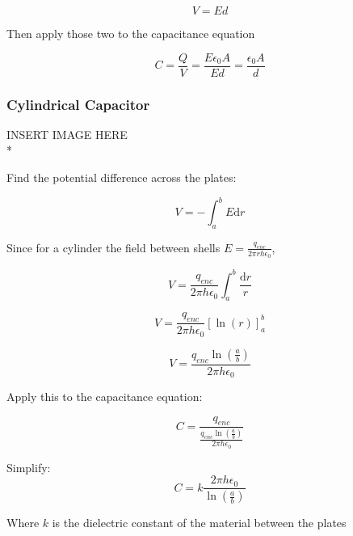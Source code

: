\documentclass[a4paper,12pt]{article}
\begin{document}
				\begin{equation*}
						V = Ed
				\end{equation*}

				Then apply those two to the capacitance equation

				\begin{equation*}
						C = \frac{Q}{V} = \frac{E\epsilon_{0}A}{Ed} = \frac{\epsilon_{0}A}{d}
				\end{equation*}
			\subsubsection{Cylindrical Capacitor}
				INSERT IMAGE HERE\\*

				Find the potential difference across the plates:

				\begin{equation*}
						V = - \int_{a}^{b} E\mathrm{d}r
				\end{equation*}

				Since for a cylinder the field between shells $E = \frac{q_{enc}}{2\pi rh \epsilon_{0}}$,

				\begin{equation*}
						V = \frac{q_{enc}}{2\pi h \epsilon_{0}}\int_{a}^{b} \frac{\mathrm{d}r}{r} 
				\end{equation*}


				\begin{equation*}
						V = \frac{q_{enc}}{2\pi h \epsilon_{0}}  \left[ \ln(r) \right]_{a}^{b}
				\end{equation*}

				\begin{equation*}
						V = \frac{q_{enc} \ln(\frac{a}{b})}{2\pi h\epsilon_{0}}
				\end{equation*}

				Apply this to the capacitance equation:

				\begin{equation*}
						C = \frac{q_{enc}}{\frac{q_{enc} \ln(\frac{a}{b})}{2\pi h\epsilon_{0}} }
				\end{equation*}

				Simplify:
				\begin{equation*}
						C = k \frac{2\pi h \epsilon_{0}}{\ln(\frac{a}{b})}
				\end{equation*}

				Where $k$ is the dielectric constant of the material between the plates
\end{document}
